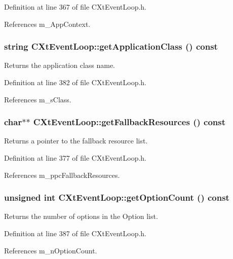 Definition at line 367 of file CXt\-Event\-Loop.h.

References m\_\-App\-Context.
\subsubsection{\setlength{\rightskip}{0pt plus 5cm}string CXt\-Event\-Loop::get\-Application\-Class () const\hspace{0.3cm}{\tt  [inline]}}\label{classCXtEventLoop_a6}


Returns the application class name.



Definition at line 382 of file CXt\-Event\-Loop.h.

References m\_\-s\-Class.
\subsubsection{\setlength{\rightskip}{0pt plus 5cm}char$\ast$$\ast$ CXt\-Event\-Loop::get\-Fallback\-Resources () const\hspace{0.3cm}{\tt  [inline]}}\label{classCXtEventLoop_a5}


Returns a pointer to the fallback resource list.



Definition at line 377 of file CXt\-Event\-Loop.h.

References m\_\-ppc\-Fallback\-Resources.
\subsubsection{\setlength{\rightskip}{0pt plus 5cm}unsigned int CXt\-Event\-Loop::get\-Option\-Count () const\hspace{0.3cm}{\tt  [inline]}}\label{classCXtEventLoop_a7}


Returns the number of options in the Option list.



Definition at line 387 of file CXt\-Event\-Loop.h.

References m\_\-n\-Option\-Count.
